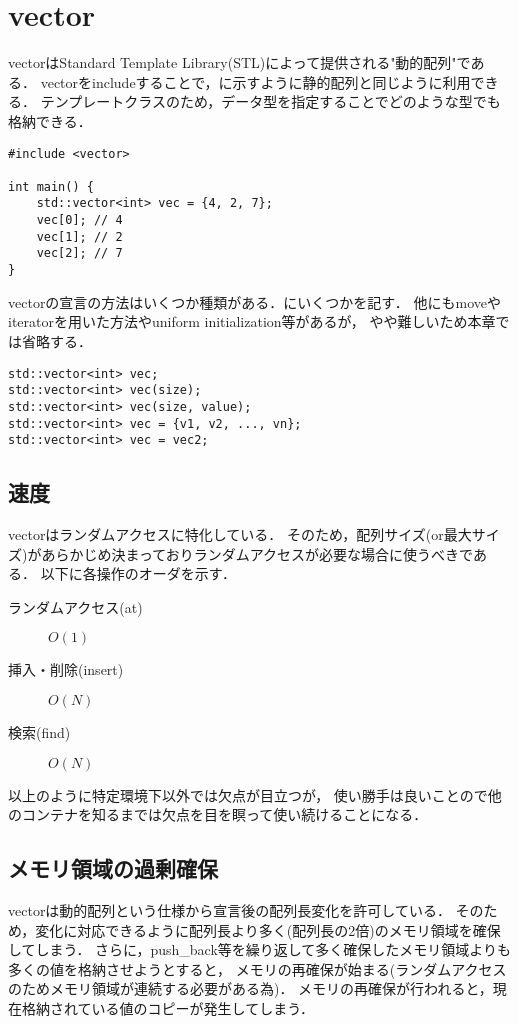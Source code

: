\section{vector}
vectorはStandard Template Library(STL)によって提供される"動的配列"である．
vectorをincludeすることで，に示すように静的配列と同じように利用できる．
テンプレートクラスのため，データ型を指定することでどのような型でも格納できる．
\begin{lstlisting}[label=cd:vector,caption=Source of using vector]
#include <vector>

int main() {
    std::vector<int> vec = {4, 2, 7};
    vec[0]; // 4
    vec[1]; // 2
    vec[2]; // 7
}
\end{lstlisting}

vectorの宣言の方法はいくつか種類がある．にいくつかを記す．
他にもmoveやiteratorを用いた方法やuniform initialization等があるが，
やや難しいため本章では省略する．
\begin{lstlisting}[label=cd:vector_first,caption=vector initialization]
std::vector<int> vec;
std::vector<int> vec(size);
std::vector<int> vec(size, value);
std::vector<int> vec = {v1, v2, ..., vn};
std::vector<int> vec = vec2;
\end{lstlisting}



\subsection{速度}
vectorはランダムアクセスに特化している．
そのため，配列サイズ(or最大サイズ)があらかじめ決まっておりランダムアクセスが必要な場合に使うべきである．
以下に各操作のオーダを示す．
\begin{description}
    \item[ランダムアクセス(at)] $O(1)$
    \item[挿入・削除(insert)] $O(N)$
    \item[検索(find)] $O(N)$
\end{description}

以上のように特定環境下以外では欠点が目立つが，
使い勝手は良いことので他のコンテナを知るまでは欠点を目を瞑って使い続けることになる．


\subsection{メモリ領域の過剰確保}
vectorは動的配列という仕様から宣言後の配列長変化を許可している．
そのため，変化に対応できるように配列長より多く(配列長の2倍)のメモリ領域を確保してしまう．
さらに，push\_back等を繰り返して多く確保したメモリ領域よりも多くの値を格納させようとすると，
メモリの再確保が始まる(ランダムアクセスのためメモリ領域が連続する必要がある為)．
メモリの再確保が行われると，現在格納されている値のコピーが発生してしまう．

